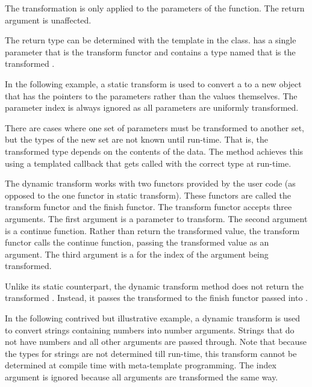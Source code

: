 The transformation is only applied to the parameters of the function. The
return argument is unaffected.

The return type can be determined with the 
template in the 
class.  has a single parameter that is the
transform functor and contains a type named  that is the
transformed .

In the following example, a static transform is used to convert a
 to a new object that has the pointers to
the parameters rather than the values themselves. The parameter index is
always ignored as all parameters are uniformly transformed.




There are cases where one set of parameters must be transformed to another
set, but the types of the new set are not known until run-time. That is,
the transformed type depends on the contents of the data. The
 method achieves this using a templated
callback that gets called with the correct type at run-time.

The dynamic transform works with two functors provided by the user code (as
opposed to the one functor in static transform). These functors are called
the transform functor and the finish functor. The transform functor accepts
three arguments. The first argument is a parameter to transform. The second
argument is a continue function. Rather than return the transformed value,
the transform functor calls the continue function, passing the transformed
value as an argument. The third argument is a  for
the index of the argument being transformed.

Unlike its static counterpart, the dynamic transform method does not return
the transformed . Instead, it passes the
transformed  to the finish functor passed
into .

In the following contrived but illustrative example, a dynamic transform is
used to convert strings containing numbers into number arguments. Strings
that do not have numbers and all other arguments are passed through. Note
that because the types for strings are not determined till run-time, this
transform cannot be determined at compile time with meta-template
programming. The index argument is ignored because all arguments are
transformed the same way.


